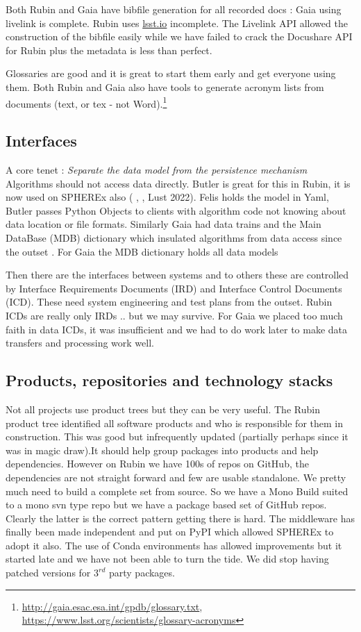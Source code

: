 \documentclass[11pt,twoside]{article}
\begin{document}
Both Rubin and Gaia have  bibfile generation for all recorded docs : Gaia using   livelink is  complete. Rubin uses \url{lsst.io} incomplete.
The Livelink API allowed the construction of the bibfile easily while we have failed to crack the Docushare API for Rubin plus the metadata is less than perfect.

Glossaries are good and it is great to start them early and get everyone using them.
Both Rubin and Gaia also have tools to generate acronym lists from documents (text, or tex - not Word).\footnote{\url{http://gaia.esac.esa.int/gpdb/glossary.txt}, \url{https://www.lsst.org/scientists/glossary-acronyms}}


\subsection{Interfaces}
A core tenet : \emph{Separate the data model from the persistence mechanism}
Algorithms should not access data directly.
Butler is great for this in Rubin, it is  now used on SPHEREx also (\cite{2022SPIE12189E..11J} , \cite{2019ASPC..523..653J}, Lust 2022).
Felis holds the model in Yaml, Butler passes Python Objects to clients with algorithm code not knowing about data location or file formats.
Similarly Gaia had data trains and the Main DataBase (MDB) dictionary which insulated algorithms from data access since the outset \citep{1999BaltA...8...57O}.
For Gaia the MDB dictionary holds all data models  \citep{2015ASPC..495...47H, 2011ASPC..442..351O}


Then there are the interfaces between systems and to others these are controlled by Interface Requirements Documents (IRD) and Interface Control Documents (ICD).
These need system engineering and test plans from the outset.
Rubin ICDs are really only IRDs .. but we may survive.
For Gaia  we placed too much faith in data ICDs, it was insufficient and we had to do work later to make data transfers and processing work well.



\subsection{Products, repositories and technology stacks}
Not all projects use product trees but they can be very useful.
The Rubin product tree identified all  software products  and who is responsible for them in construction.
This was good but infrequently updated (partially perhaps since it was in magic draw).It should help group packages into products and help dependencies.
However on Rubin we have 100s of repos on GitHub, the dependencies are not straight forward and few are usable standalone.
We pretty much need to build a complete set from source.
So we have a Mono Build suited to a mono svn type repo but we have a package based set of GitHub repos.
Clearly the latter is the correct pattern getting there is hard.
The middleware has finally been made independent and put on PyPI which allowed SPHEREx to adopt it also.
The use of Conda environments has allowed improvements but it started late and we have not been able to turn the tide.
We did stop having patched versions for $3^{rd}$ party packages.
\end{document}
